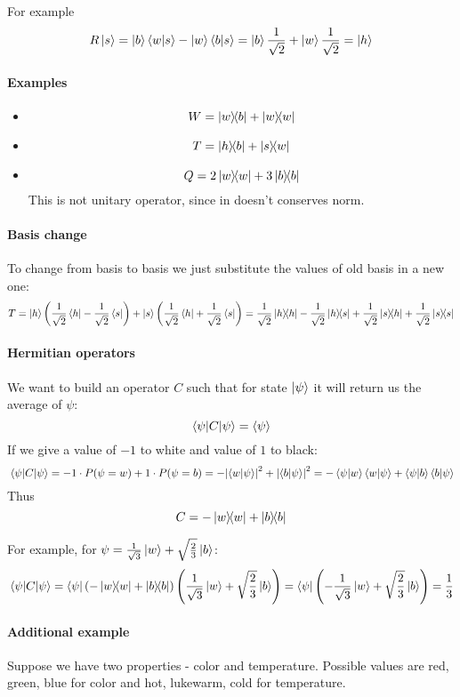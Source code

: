 For example
$$R\ket{s}= \ket{b}\braket{w}{s}-\ket{w}\braket{b}{s}=\ket{b}\frac{1}{\sqrt{2}}+ \ket{w}\frac{1}{\sqrt{2}} = \ket{h}$$

\paragraph{Examples}
\begin{itemize}
	\item $$W = \op{w}{b} + \op{w}{w}$$
	\item $$T = \op{h}{b} + \op{s}{w}$$
	\item $$Q = 2\op{w}{w} + 3\op{b}{b}$$
	This is not unitary operator, since in doesn't conserves norm.
\end{itemize}

\paragraph{Basis change}
To change from basis to basis we just substitute the values of old basis in a new one:
$$T = \ket{h} \left(\frac{1}{\sqrt{2}}\bra{h} - \frac{1}{\sqrt{2}}\bra{s}\right) + \ket{s} \left(\frac{1}{\sqrt{2}}\bra{h} + \frac{1}{\sqrt{2}}\bra{s}\right) =  \frac{1}{\sqrt{2}}\op{h}{h} - \frac{1}{\sqrt{2}}\op{h}{s} + \frac{1}{\sqrt{2}}\op{s}{h} + \frac{1}{\sqrt{2}}\op{s}{s}$$

\paragraph{Hermitian operators}
We want to build an operator $C$ such that for state $\ket{\psi}$ it will return us the average of $\psi$:
$$\braket{\psi|C}{\psi} = \langle \psi \rangle$$
If we give a value of $-1$ to white and value of $1$ to black:
$$\mel{\psi}{C}{\psi} = -1 \cdot P(\psi = w) + 1 \cdot P(\psi = b) = - \abs{\braket{w}{\psi}}^2 + \abs{\braket{b}{\psi}}^2 = -\braket{\psi}{w}\braket{w}{\psi}+\braket{\psi}{b}\braket{b}{\psi}$$
Thus
$$C = -\op{w}{w}+\op{b}{b}$$

For example, for $\psi = \frac{1}{\sqrt{3}}\ket{w} + \sqrt{\frac{2}{3}}\ket{b}$:
$$\mel{\psi}{C}{\psi} = \bra{\psi} \left( -\op{w}{w}+\op{b}{b} \right)\left( \frac{1}{\sqrt{3}}\ket{w} + \sqrt{\frac{2}{3}}\ket{b} \right) = \bra{\psi} \left(-\frac{1}{\sqrt{3}}\ket{w} + \sqrt{\frac{2}{3}}\ket{b}\right) = \frac{1}{3}$$


\paragraph{Additional example}
Suppose we have two properties - color and temperature. Possible values are red, green, blue for color and hot, lukewarm, cold for temperature.

